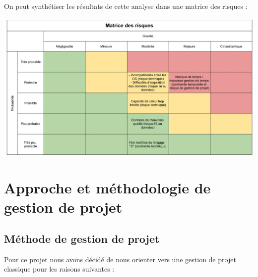 \documentclass[a4paper, 12pt]{report}
\begin{document}
\bigskip

On peut synthétiser les résultats de cette analyse dans une matrice des risques :

\begin{center}
    \includegraphics[width = \textwidth]{IMG/mat_risques.png}
\end{center}
\clearpage

\section{Approche et méthodologie de gestion de projet}

\subsection{Méthode de gestion de projet}

Pour ce projet nous avons décidé de nous orienter vers une gestion de projet classique pour les raisons suivantes :
\bigskip
\end{document}
